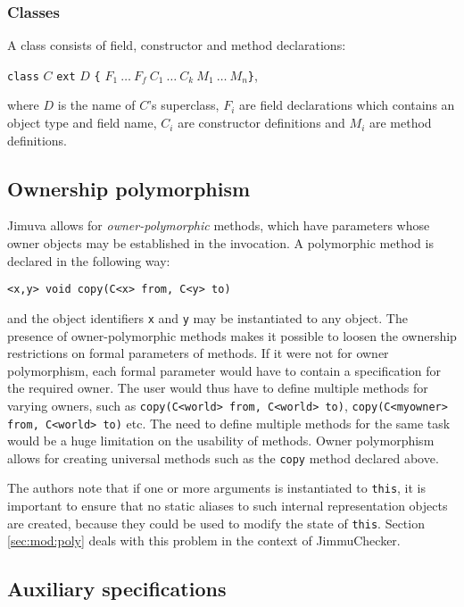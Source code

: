 \documentclass{pracamgr}
\theoremstyle{break}
\theoremstyle{break}
\theoremstyle{break}
\begin{document}
\subsubsection{Classes}

A class consists of field, constructor and method declarations:
\begin{center}
  \texttt{class} $C$ \texttt{ext} $D$ \texttt{\{} $F_1\ \dots\ F_f\
  C_1\ \dots\ C_k\ M_1\ \dots\ M_n$\texttt{\}},
\end{center}
where $D$ is the name of $C$'s superclass, $F_i$ are field
declarations which contains an object type and field name, $C_i$ are
constructor definitions and $M_i$ are method definitions.

\subsection{Ownership polymorphism}
\label{sec:jimuva:poly}

Jimuva allows for \emph{owner-polymorphic} methods, which have
parameters whose owner objects may be established in the invocation. A
polymorphic method is declared in the following way:
\begin{center}
  \texttt{<x,y> void copy(C<x> from, C<y> to)}
\end{center}
and the object identifiers \texttt{x} and \texttt{y} may be
instantiated to any object. The presence of owner-polymorphic methods
makes it possible to loosen the ownership restrictions on formal
parameters of methods. If it were not for owner polymorphism, each
formal parameter would have to contain a specification for the
required owner. The user would thus have to define multiple methods
for varying owners, such as \texttt{copy(C<world> from, C<world> to)},
\texttt{copy(C<myowner> from, C<world> to)} etc. The need to define
multiple methods for the same task would be a huge limitation on the
usability of methods. Owner polymorphism allows for creating universal
methods such as the \texttt{copy} method declared above.

The authors note that if one or more arguments is instantiated to
\texttt{this}, it is important to ensure that no static aliases to
such internal representation objects are created, because they could
be used to modify the state of \texttt{this}. Section
\ref{sec:mod:poly} deals with this problem in the context of
JimmuChecker.


\subsection{Auxiliary specifications}
\label{sub:jimuva-aux}
\end{document}
